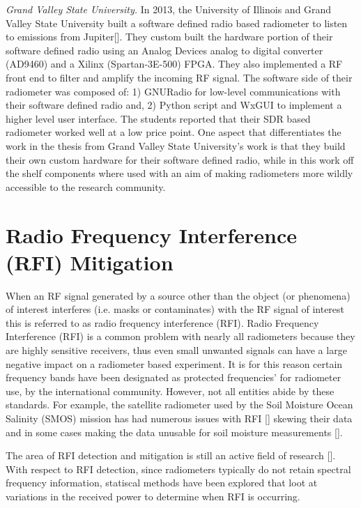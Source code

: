 \emph{Grand Valley State University.}  In 2013, the University of Illinois and Grand Valley State University built a software defined radio based radiometer to listen to emissions from Jupiter[\cite{Behnke}].  They custom built the hardware portion of their software defined radio using an Analog Devices analog to digital converter (AD9460) and a Xilinx (Spartan-3E-500) FPGA.  They also implemented a RF front end to filter and amplify the incoming RF signal.  The software side of their radiometer was composed of: 1) GNURadio for low-level communications with their software defined radio and, 2) Python script and WxGUI to implement a higher level user interface.  The students reported that their SDR based radiometer worked well at a low price point.  One aspect that differentiates the work in the thesis from Grand Valley State University's work is that they build their own custom hardware for their software defined radio, while in this work off the shelf components where used with an aim of making radiometers more wildly accessible to the research community.

\section{Radio Frequency Interference (RFI) Mitigation}
When an RF signal generated by a source other than the object (or phenomena) of interest interferes (i.e. masks or contaminates) with the RF signal of interest this is referred to as radio frequency interference (RFI).  Radio Frequency Interference (RFI) is a common problem with nearly all radiometers because they are highly sensitive receivers, thus even small unwanted signals can have a large negative impact on a radiometer based experiment.  It is for this reason certain frequency bands have been designated as protected frequencies' for radiometer use, by the international community.  However, not all entities abide by these standards.  For example, the satellite radiometer used by the Soil Moisture Ocean Salinity (SMOS) mission has had numerous issues with RFI [\cite{Kerr}] skewing their data and in some cases making the data unusable for soil moisture measurements [\cite{Richaume}].  

The area of RFI detection and mitigation is still an active field of research [\cite{Forte}].  With respect to RFI detection, since radiometers typically do not retain spectral frequency information, statiscal methods have been explored that loot at variations in the received power to determine when RFI is occurring.

